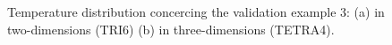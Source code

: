 \begin{figure}
   \centering
  \caption{Temperature distribution concercing the validation example 3: (a) in two-dimensions (TRI6) (b) in three-dimensions (TETRA4).}
\label{fig:NAFEMS_example_comparison}
\end{figure}

